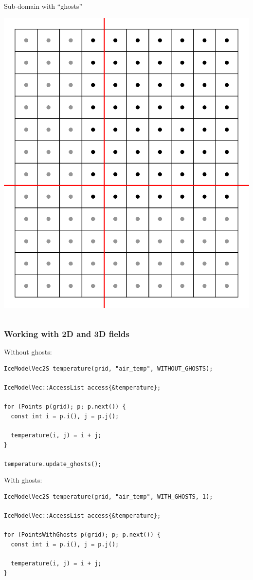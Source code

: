 \documentclass[hide notes,intlimits]{beamer}
\begin{document}
\begin{frame}
\begin{columns}
    \begin{column}{0.5\linewidth}
    Sub-domain with ``ghosts''
      \begin{center}
      \includegraphics[width=0.75\linewidth]{grid-5}
    \end{center}
    \end{column}
  \end{columns}
\end{frame}

\begin{frame}[fragile]
  \frametitle{Working with 2D and 3D fields}

  Without ghosts:
\begin{lstlisting}
IceModelVec2S temperature(grid, "air_temp", WITHOUT_GHOSTS);

IceModelVec::AccessList access{&temperature};

for (Points p(grid); p; p.next()) {
  const int i = p.i(), j = p.j();

  temperature(i, j) = i + j;
}

temperature.update_ghosts();
\end{lstlisting}

  With ghosts:
\begin{lstlisting}
IceModelVec2S temperature(grid, "air_temp", WITH_GHOSTS, 1);

IceModelVec::AccessList access{&temperature};

for (PointsWithGhosts p(grid); p; p.next()) {
  const int i = p.i(), j = p.j();

  temperature(i, j) = i + j;
}
\end{lstlisting}
  
\end{frame}
\end{document}

